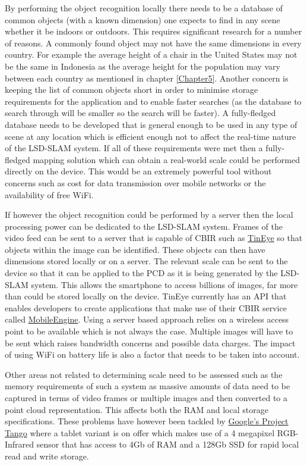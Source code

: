 By performing the object recognition locally there needs to be a database of common objects (with a known dimension) one expects to find in any scene whether it be indoors or outdoors. This requires significant research for a number of reasons. A commonly found object may not have the same dimensions in every country. For example the average height of a chair in the United States may not be the same in Indonesia as the average height for the population may vary between each country as mentioned in chapter \ref{Chapter5}. Another concern is keeping the list of common objects short in order to minimise storage requirements for the application and to enable faster searches (as the database to search through will be smaller so the search will be faster). A fully-fledged database needs to be developed that is general enough to be used in any type of scene at any location which is efficient enough not to affect the real-time nature of the LSD-SLAM system. If all of these requirements were met then a fully-fledged mapping solution which can obtain a real-world scale could be performed directly on the device. This would be an extremely powerful tool without concerns such as cost for data transmission over mobile networks or the availability of free WiFi. 

If however the object recognition could be performed by a server then the local processing power can be dedicated to the LSD-SLAM system. Frames of the video feed can be sent to a server that is capable of CBIR such as \href{https://www.tineye.com/}{TinEye} so that objects within the image can be identified. These objects can then have dimensions stored locally or on a server.  The relevant scale can be sent to the device so that it can be applied to the PCD as it is being generated by the LSD-SLAM system. This allows the smartphone to access billions of images, far more than could be stored locally on the device. TinEye currently has an API that enables developers to create applications that make use of their CBIR service called \href{https://services.tineye.com/MobileEngine}{MobileEngine}. Using a server based approach relies on a wireless access point to be available which is not always the case. Multiple images will have to be sent which raises bandwidth concerns and possible data charges. The impact of using WiFi on battery life is also a factor that needs to be taken into account. 

Other areas not related to determining scale need to be assessed such as the memory requirements of such a system as massive amounts of data need to be captured in terms of video frames or multiple images and then converted to a point cloud representation. This affects both the RAM and local storage specifications. These problems have however been tackled by \href{https://www.google.com/atap/project-tango/}{Google's Project Tango} where a tablet variant is on offer which makes use of a 4 megapixel RGB-Infrared sensor that has access to 4Gb of RAM and a 128Gb SSD for rapid local read and write storage.  

